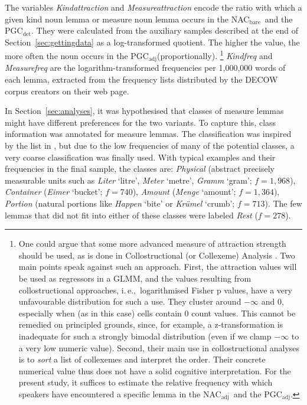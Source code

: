 \documentclass[USenglish]{article}
\newcommand{\ie}{i.\,e.,}
\newcommand{\Sub}[1]{\ensuremath{\mathrm{_{#1}}}}
\newcommand{\NACb}{NAC\Sub{bare}}
\newcommand{\NACa}{NAC\Sub{adj}}
\newcommand{\PGCd}{PGC\Sub{det}}
\newcommand{\PGCa}{PGC\Sub{adj}}
\begin{document}
The variables \textit{Kindattraction} and \textit{Measureattraction} encode the ratio with which a given kind noun lemma or measure noun lemma occurs in the \NACb\ and the \PGCd.
They were calculated from the auxiliary samples described at the end of Section~\ref{sec:gettingdata} as a log-transformed quotient.
The higher the value, the more often the noun occurs in the \PGCa (proportionally).%
\footnote{One could argue that some more advanced measure of attraction strength should be used, as is done in Collostructional (or Collexeme) Analysis \citep{GriesStefanowitsch2004}.
Two main points speak against such an approach.
First, the attraction values will be used as regressors in a GLMM, and the values resulting from collostructional approaches, \ie\ logarithmised Fisher p values, have a very unfavourable distribution for such a use.
They cluster around $-\infty$ and $0$, especially when (as in this case) cells contain $0$ count values.
This cannot be remedied on principled grounds, since, for example, a z-transformation is inadequate for such a strongly bimodal distribution (even if we clamp $-\infty$ to a very low numeric value).
Second, their main use in collostructional analyses is to \textit{sort} a list of collexemes and interpret the order.
Their concrete numerical value thus does not have a solid cognitive interpretation.
For the present study, it suffices to estimate the relative frequency with which speakers have encountered a specific lemma in the \NACa\ and the \PGCa.
}
\textit{Kindfreq} and \textit{Measurefreq} are the logarithm-transformed frequencies per 1,000,000 words of each lemma, extracted from the frequency lists distributed by the DECOW corpus creators on their web page.

In Section~\ref{sec:analyses}, it was hypothesised that classes of measure lemmas might have different preferences for the two variants.
To capture this, class information was annotated for measure lemmas.
The classification was inspired by the list in \cite[530]{Koptjevskaja2001}, but due to the low frequencies of many of the potential classes, a very coarse classification was finally used.
With typical examples and their frequencies in the final sample, the classes are:
\textit{Physical} (abstract precisely measurable units such as \textit{Liter} `litre', \textit{Meter} `metre', \textit{Gramm} `gram'; $f=1,968$),
\textit{Container} (\textit{Eimer} `bucket'; $f=740$), 
\textit{Amount} (\textit{Menge} `amount'; $f=1,364$), 
\textit{Portion} (natural portions like \textit{Happen} `bite' or \textit{Krümel} `crumb'; $f=713$).
The few lemmas that did not fit into either of these classes were labeled \textit{Rest} ($f=278$).
\end{document}
